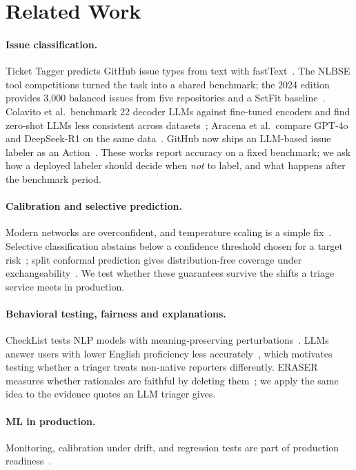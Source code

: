 \section{Related Work}\label{sec:related}

\paragraph{Issue classification.} Ticket Tagger predicts GitHub issue types from text with
fastText~\cite{kallis2021tickettagger}. The NLBSE tool competitions turned the task into a shared
benchmark; the 2024 edition provides 3{,}000 balanced issues from five repositories and a SetFit
baseline~\cite{nlbse24}. Colavito et al.\ benchmark 22 decoder LLMs against fine-tuned
encoders and find zero-shot LLMs less consistent across datasets~\cite{colavito2025issue}; Aracena
et al.\ compare GPT-4o and DeepSeek-R1 on the same data~\cite{aracena2025issue}. GitHub now ships an
LLM-based issue labeler as an Action~\cite{github2025labeler}. These works report accuracy on a fixed
benchmark; we ask how a deployed labeler should decide when \emph{not} to label, and what happens
after the benchmark period.

\paragraph{Calibration and selective prediction.} Modern networks are overconfident, and temperature
scaling is a simple fix~\cite{guo2017calibration}. Selective classification abstains below a
confidence threshold chosen for a target risk~\cite{geifman2017selective}; split conformal
prediction gives distribution-free coverage under exchangeability~\cite{angelopoulos2021conformal}.
We test whether these guarantees survive the shifts a triage service meets in production.

\paragraph{Behavioral testing, fairness and explanations.} CheckList tests NLP models with
meaning-preserving perturbations~\cite{ribeiro2020checklist}. LLMs answer users with lower English
proficiency less accurately~\cite{poole2024llm}, which motivates testing whether a triager treats
non-native reporters differently. ERASER measures whether rationales are faithful by deleting
them~\cite{deyoung2020eraser}; we apply the same idea to the evidence quotes an LLM triager gives.

\paragraph{ML in production.} Monitoring, calibration under drift, and regression tests are part of
production readiness~\cite{breck2017mltestscore,kastner2025mlip}.
